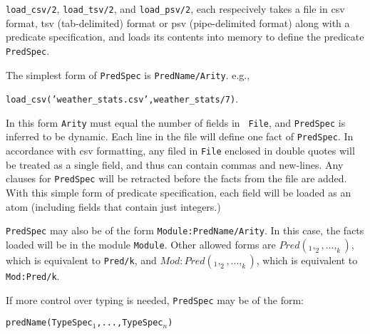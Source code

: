 \begin{description}


{\tt load\_csv/2}, {\tt load\_tsv/2}, and {\tt load\_psv/2}, each
respecively takes a file in csv format, tsv (tab-delimited) format or
psv (pipe-delimited format) along with a predicate specification, and
loads its contents into memory to define the predicate {\tt PredSpec}.

The simplest form of {\tt PredSpec} is {\tt PredName/Arity}. e.g.,

{\tt load\_csv('weather\_stats.csv',weather\_stats/7)}.

In this form {\tt Arity} must equal the number of fields in {\tt
  File}, and {\tt PredSpec} is inferred to be dynamic.  Each line in
the file will define one fact of {\tt PredSpec}.  In accordance with
csv formatting, any filed in {\tt File} enclosed in double quotes will
be treated as a single field, and thus can contain commas and
new-lines.  Any clauses for {\tt PredSpec} will be retracted before
the facts from the file are added.  With this simple form of predicate
specification, each field will be loaded as an atom (including fields
that contain just integers.)

{\tt PredSpec} may also be of the form {\tt Module:PredName/Arity}.
In this case, the facts loaded will be in the module {\tt Module}.
Other allowed forms are $Pred(_1,_2,...,_k)$, which is
equivalent to {\tt Pred/k}, and $Mod:Pred(_1,_2,...,_k)$,
which is equivalent to {\tt Mod:Pred/k}.

If more control over typing is needed, {\tt PredSpec} may be of the
form:

{\tt predName(TypeSpec$_1$,...,TypeSpec$_n$)}


\end{description}
